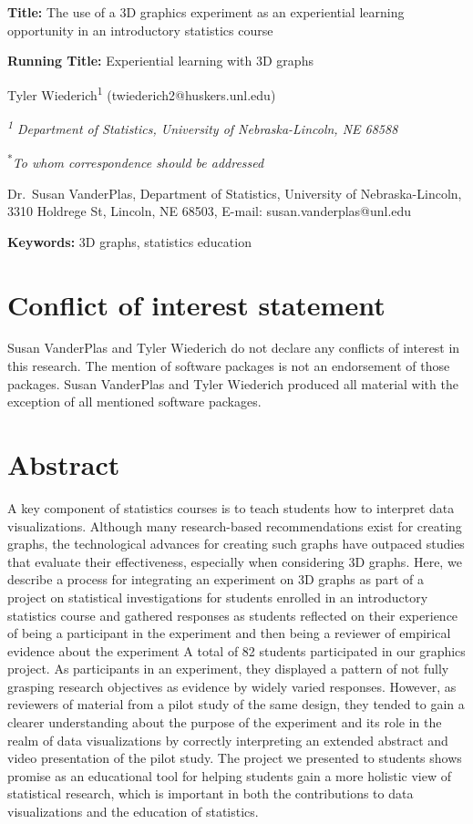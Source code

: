 \documentclass[
  12pt,
]{article}
\date{}
\begin{document}
\textbf{Title:} The use of a 3D graphics experiment as an experiential
learning opportunity in an introductory statistics course

\textbf{Running Title:} Experiential learning with 3D graphs

Tyler Wiederich\textsuperscript{1} (twiederich2@huskers.unl.edu)

\emph{\textsuperscript{1} Department of Statistics, University of
Nebraska-Lincoln, NE 68588}

\textsuperscript{*}\emph{To whom correspondence should be addressed}

Dr.~Susan VanderPlas, Department of Statistics, University of
Nebraska-Lincoln, 3310 Holdrege St, Lincoln, NE 68503, E-mail:
susan.vanderplas@unl.edu

\textbf{Keywords:} 3D graphs, statistics education

\section{Conflict of interest
statement}\label{conflict-of-interest-statement}

Susan VanderPlas and Tyler Wiederich do not declare any conflicts of
interest in this research. The mention of software packages is not an
endorsement of those packages. Susan VanderPlas and Tyler Wiederich
produced all material with the exception of all mentioned software
packages.

\newpage

\section{Abstract}\label{abstract}

A key component of statistics courses is to teach students how to
interpret data visualizations. Although many research-based
recommendations exist for creating graphs, the technological advances
for creating such graphs have outpaced studies that evaluate their
effectiveness, especially when considering 3D graphs. Here, we describe
a process for integrating an experiment on 3D graphs as part of a
project on statistical investigations for students enrolled in an
introductory statistics course and gathered responses as students
reflected on their experience of being a participant in the experiment
and then being a reviewer of empirical evidence about the experiment A
total of 82 students participated in our graphics project. As
participants in an experiment, they displayed a pattern of not fully
grasping research objectives as evidence by widely varied responses.
However, as reviewers of material from a pilot study of the same design,
they tended to gain a clearer understanding about the purpose of the
experiment and its role in the realm of data visualizations by correctly
interpreting an extended abstract and video presentation of the pilot
study. The project we presented to students shows promise as an
educational tool for helping students gain a more holistic view of
statistical research, which is important in both the contributions to
data visualizations and the education of statistics.
\end{document}
